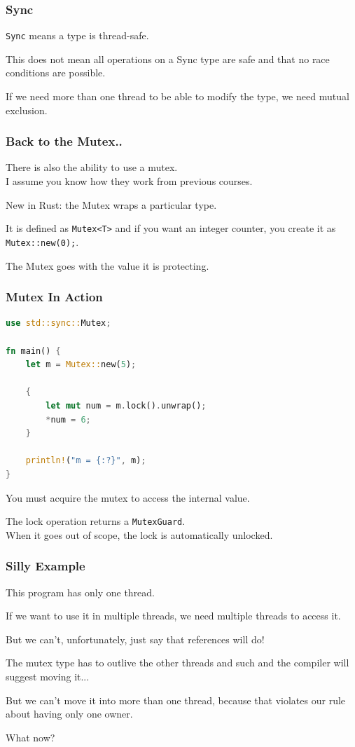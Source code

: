 \begin{frame}
\frametitle{Sync}

\texttt{Sync} means a type is thread-safe.


This does not mean all operations on a Sync type are safe and that no race conditions are possible.

If we need more than one thread to be able to modify the type, we need mutual exclusion.
\end{frame}


\begin{frame}
\frametitle{Back to the Mutex..}
There is also the ability to use a mutex.\\
\quad I assume you know how they work from previous courses.

New in Rust: the Mutex wraps a particular type.

It is defined as \texttt{Mutex<T>} and if you want an integer counter, you create it as \texttt{Mutex::new(0);}.


The Mutex goes with the value it is protecting.
\end{frame}


\begin{frame}[fragile]
\frametitle{Mutex In Action}

\begin{lstlisting}[language=Rust]
use std::sync::Mutex;

fn main() {
    let m = Mutex::new(5);

    {
        let mut num = m.lock().unwrap();
        *num = 6;
    }

    println!("m = {:?}", m);
}
\end{lstlisting}

You must acquire the mutex to access the internal value.

The lock operation returns a \texttt{MutexGuard}.\\
\quad When it goes out of scope, the lock is automatically unlocked.


\end{frame}


\begin{frame}
\frametitle{Silly Example}
This program has only one thread.

If we want to use it in multiple threads, we need multiple threads to access it. 

But we can't, unfortunately, just say that references will do! 

The mutex type has to outlive the other threads and such and the compiler will suggest moving it... 

But we can't move it into more than one thread, because that violates our rule about having only one owner. 

What now?



\end{frame}

